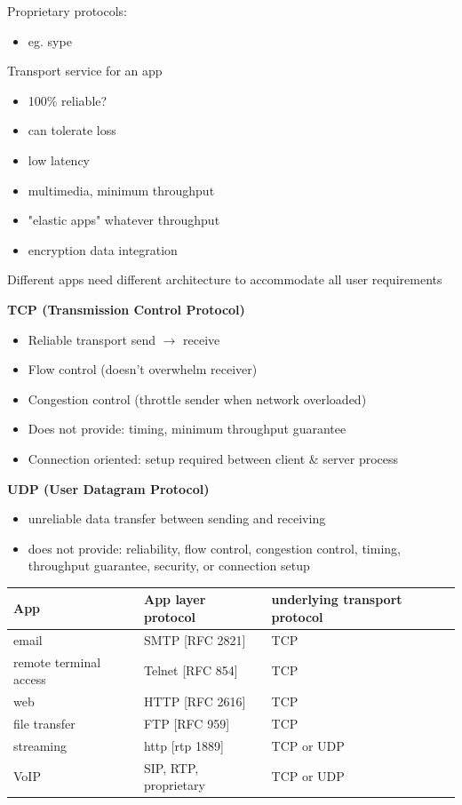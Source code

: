 \documentclass[11pt]{article}
\begin{document}
Proprietary protocols:
\begin{itemize}
\item eg. sype
\end{itemize}

Transport service for an app
\begin{itemize}
\item 100\% reliable?
\item can tolerate loss
\item low latency
\item multimedia, minimum throughput
\item "elastic apps" whatever throughput
\item encryption data integration
\end{itemize}

Different apps need different architecture to accommodate all user
requirements

\textbf{TCP (Transmission Control Protocol)}
\begin{itemize}
\item Reliable transport send \(\rightarrow\) receive
\item Flow control (doesn't overwhelm receiver)
\item Congestion control (throttle sender when network overloaded)
\item Does not provide: timing, minimum throughput guarantee
\item Connection oriented: setup required between client \& server process
\end{itemize}

\textbf{UDP (User Datagram Protocol)}
\begin{itemize}
\item unreliable data transfer between sending and receiving
\item does not provide: reliability, flow control, congestion control,
timing, throughput guarantee, security, or connection setup
\end{itemize}


\begin{center}
\begin{tabular}{lll}
\textbf{App} & \textbf{App layer protocol} & \textbf{underlying transport protocol}\\
\hline
email & SMTP [RFC 2821] & TCP\\
remote terminal access & Telnet [RFC 854] & TCP\\
web & HTTP [RFC 2616] & TCP\\
file transfer & FTP [RFC 959] & TCP\\
streaming & http [rtp 1889] & TCP or UDP\\
VoIP & SIP, RTP, proprietary & TCP or UDP\\
\end{tabular}
\end{center}
\end{document}

